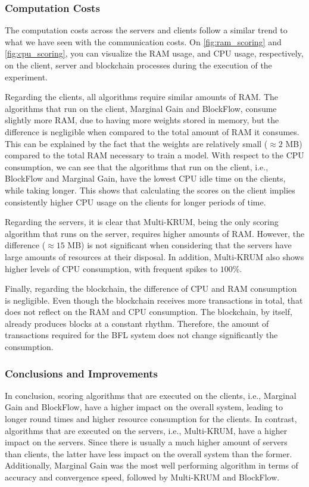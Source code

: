\subsubsection{Computation Costs}

The computation costs across the servers and clients follow a similar trend to what we have seen with the communication costs. On \autoref{fig:ram_scoring} and \autoref{fig:cpu_scoring}, you can visualize the RAM usage, and CPU usage, respectively, on the client, server and blockchain processes during the execution of the experiment.

Regarding the clients, all algorithms require similar amounts of RAM. The algorithms that run on the client, Marginal Gain and BlockFlow, consume slightly more RAM, due to having more weights stored in memory, but the difference is negligible when compared to the total amount of RAM it consumes. This can be explained by the fact that the weights are relatively small ($\approx 2$ MB) compared to the total RAM necessary to train a model. With respect to the CPU consumption, we can see that the algorithms that run on the client, i.e., BlockFlow and Marginal Gain, have the lowest CPU idle time on the clients, while taking longer. This shows that calculating the scores on the client implies consistently higher CPU usage on the clients for longer periods of time.

Regarding the servers, it is clear that Multi-KRUM, being the only scoring algorithm that runs on the server, requires higher amounts of RAM. However, the difference ($\approx 15$ MB) is not significant when considering that the servers have large amounts of resources at their disposal. In addition, Multi-KRUM also shows higher levels of CPU consumption, with frequent spikes to $100\%$.

Finally, regarding the blockchain, the difference of CPU and RAM consumption is negligible. Even though the blockchain receives more transactions in total, that does not reflect on the RAM and CPU consumption. The blockchain, by itself, already produces blocks at a constant rhythm. Therefore, the amount of transactions required for the BFL system does not change significantly the consumption.

\subsubsection{Conclusions and Improvements}

In conclusion, scoring algorithms that are executed on the clients, i.e., Marginal Gain and BlockFlow, have a higher impact on the overall system, leading to longer round times and higher resource consumption for the clients. In contrast, algorithms that are executed on the servers, i.e., Multi-KRUM, have a higher impact on the servers. Since there is usually a much higher amount of servers than clients, the latter have less impact on the overall system than the former. Additionally, Marginal Gain was the most well performing algorithm in terms of accuracy and convergence speed, followed by Multi-KRUM and BlockFlow.

